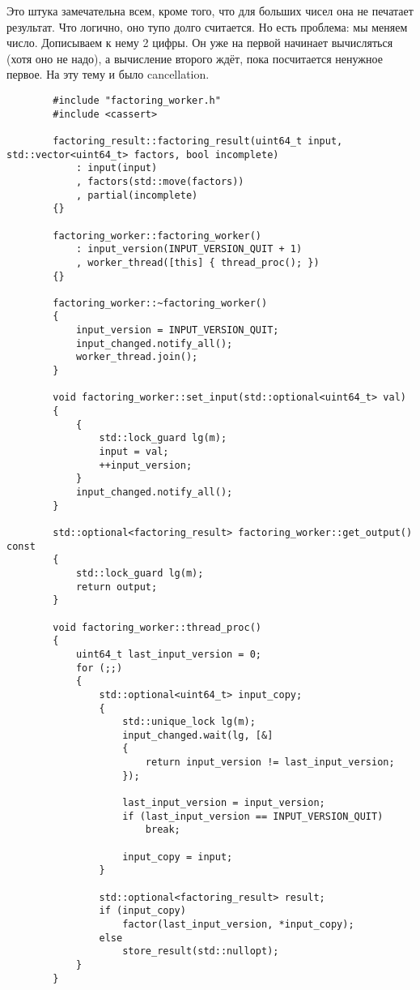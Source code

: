 \documentclass{article}
\begin{document}
    Это штука замечательна всем, кроме того, что для больших чисел она не печатает результат. Что логично, оно тупо долго считается. Но есть проблема: мы меняем число. Дописываем к нему 2 цифры. Он уже на первой начинает вычисляться (хотя оно не надо), а вычисление второго ждёт, пока посчитается ненужное первое. На эту тему и было cancellation.
    \begin{verbatim}
        #include "factoring_worker.h"
        #include <cassert>
        
        factoring_result::factoring_result(uint64_t input, std::vector<uint64_t> factors, bool incomplete)
            : input(input)
            , factors(std::move(factors))
            , partial(incomplete)
        {}
        
        factoring_worker::factoring_worker()
            : input_version(INPUT_VERSION_QUIT + 1)
            , worker_thread([this] { thread_proc(); })
        {}
        
        factoring_worker::~factoring_worker()
        {
            input_version = INPUT_VERSION_QUIT;
            input_changed.notify_all();
            worker_thread.join();
        }
        
        void factoring_worker::set_input(std::optional<uint64_t> val)
        {
            {
                std::lock_guard lg(m);
                input = val;
                ++input_version;
            }
            input_changed.notify_all();
        }
        
        std::optional<factoring_result> factoring_worker::get_output() const
        {
            std::lock_guard lg(m);
            return output;
        }
        
        void factoring_worker::thread_proc()
        {
            uint64_t last_input_version = 0;
            for (;;)
            {
                std::optional<uint64_t> input_copy;
                {
                    std::unique_lock lg(m);
                    input_changed.wait(lg, [&]
                    {
                        return input_version != last_input_version;
                    });
                    
                    last_input_version = input_version;
                    if (last_input_version == INPUT_VERSION_QUIT)
                        break;
                    
                    input_copy = input;
                }
                
                std::optional<factoring_result> result;
                if (input_copy)
                    factor(last_input_version, *input_copy);
                else
                    store_result(std::nullopt);
            }
        }
        

\end{verbatim}
\end{document}
